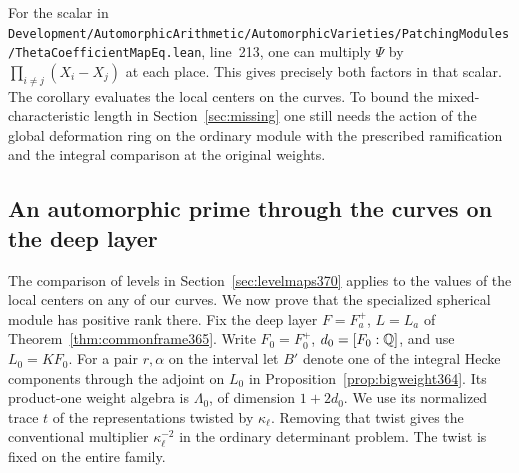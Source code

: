 \documentclass[a4paper,11pt]{article}
\theoremstyle{definition}
\theoremstyle{remark}
\newcommand{\srcloc}[2]{{\small\nolinkurl{#1.lean}}, line~#2}
\numberwithin{equation}{section}
\begin{document}
For the scalar in
\srcloc{Development/AutomorphicArithmetic/AutomorphicVarieties/PatchingModules/ThetaCoefficientMapEq}{213},
one can multiply \(\Psi\) by \(\prod_{i\ne j}(X_i-X_j)\) at
each place. This gives precisely both factors in that scalar.
The corollary evaluates the local centers on the curves.
To bound the mixed-characteristic length in
Section~\ref{sec:missing} one still needs the action of the
global deformation ring on the ordinary module with the
prescribed ramification and the integral comparison at the
original weights.


\subsection{An automorphic prime through the curves on the deep layer}
\label{sec:basesupport371}

The comparison of levels in Section~\ref{sec:levelmaps370}
applies to the values of the local centers on any of our
curves. We now prove that the specialized spherical module
has positive rank there. Fix the deep layer
\(F=F_a^+\), \(L=L_a\) of Theorem~\ref{thm:commonframe365}.
Write \(F_0=F_0^+\), \(d_0=[F_0:\mathbb Q]\), and use \(L_0=KF_0\).
For a pair \(r,\alpha\) on the interval let \(B'\) denote
one of the integral Hecke components through the adjoint on
\(L_0\) in Proposition~\ref{prop:bigweight364}. Its product-one
weight algebra is \(\Lambda_0\), of dimension \(1+2d_0\).
We use its normalized trace \(t\) of the representations
twisted by \(\kappa_\ell\). Removing that twist gives the
conventional multiplier \(\kappa_\ell^{-2}\) in the ordinary
determinant problem. The twist is fixed on the entire family.
\end{document}
